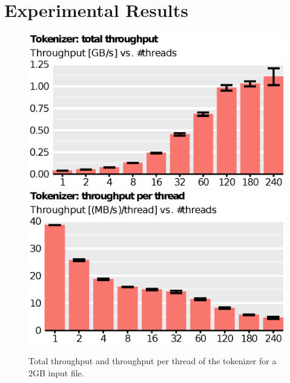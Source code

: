 
\section{Experimental Results}\label{sec:exp}

\begin{figure}
    \includegraphics[scale=.45]{img/def/tokenizer_tp_total.eps}
    \includegraphics[scale=.45]{img/def/tokenizer_tp_per_thread.eps}
    \caption{Total throughput and throughput per thread of the tokenizer
    for a 2GB input file.}
    \label{fig:tokenizertp}
\end{figure}

